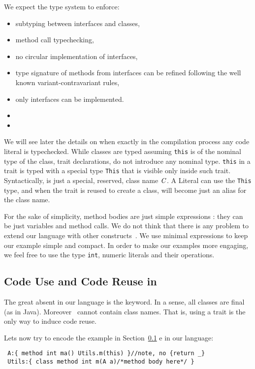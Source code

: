 We expect the type system to enforce: 
\begin{itemize}
\item subtyping between interfaces and classes,
\item method call typechecking,
\item no circular implementation of interfaces,
\item type signature of methods from interfaces can be refined following the well known variant-contravariant rules,
\item only interfaces can be implemented.
\item {}
\item {}
\end{itemize}
We will see later the details on when exactly in the compilation process any code literal is typechecked.
While classes are typed assuming \lstinline{this} is of the nominal type of the
class, trait declarations, do not introduce any nominal type.  \lstinline{this}
in a trait is typed with a special type \lstinline{This} that is visible only
inside such trait. Syntactically, \Q@This@ is just a special, reserved, class name $\mathit{C}$.
A Literal can use the \lstinline{This} type,
and when the trait is reused to create a class, \Q@This@ will become just
an alias for the class name.

For the sake of simplicity, method bodies are just simple expressions
\me: they can be just variables and method calls.
We do not think that there is any problem to extend our language with
other constructs~. We use minimal expressions to keep our example
simple and compact. In order to make our examples more engaging, we
feel free to use the type \lstinline{int}, numeric literals and their operations.

\subsection{Code Use and Code Reuse in \name}

The great absent in our language is the  \Q@extends@ keyword.
In a sense, all classes are final (as in Java).
Moreover  \use\ cannot contain class names.
That is, using a trait is the only way to induce code reuse.

Lets now try to encode the example in Section~\ref{} e in our language:

\begin{lstlisting}
 A:{ method int ma() Utils.m(this) }//note, no {return _}
 Utils:{ class method int m(A a)/*method body here*/ }
\end{lstlisting} 

